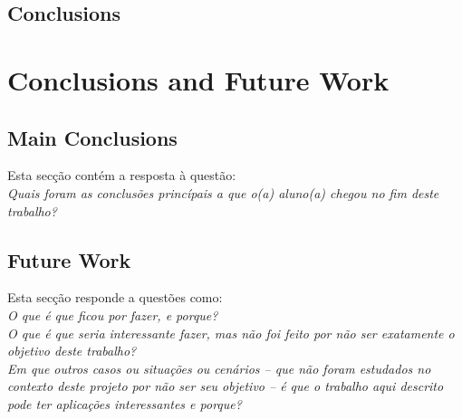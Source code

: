\documentclass[titlepage,12pt,a4paper,times]{book}
\begin{document}
\section{Conclusions}
\label{chap4:sec:concs}

\chapter{Conclusions and Future Work}
\label{chap:cfw}

\section{Main Conclusions}
\label{sec:main-conc}

Esta secção contém a resposta à questão: \\
\emph{Quais foram as conclusões princípais a que o(a) aluno(a) chegou no fim
deste trabalho?}

\section{Future Work}
\label{sec:future-work}

Esta secção responde a questões como:\\
\emph{O que é que ficou por fazer, e porque?}\\
\emph{O que é que seria interessante fazer, mas não foi feito por não ser
exatamente o objetivo deste trabalho?}\\
\emph{Em que outros casos ou situações ou cenários -- que não foram estudados
no contexto deste projeto por não ser seu objetivo -- é que o trabalho aqui
descrito pode ter aplicações interessantes e porque?}

% 
% 
% 
% 

\backmatter



\end{document}
